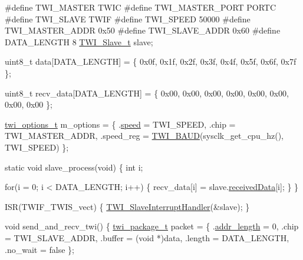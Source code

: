 \begin{DoxyCode}
\textcolor{preprocessor}{         #define TWI\_MASTER       TWIC}
\textcolor{preprocessor}{}\textcolor{preprocessor}{         #define TWI\_MASTER\_PORT  PORTC}
\textcolor{preprocessor}{}\textcolor{preprocessor}{         #define TWI\_SLAVE        TWIF}
\textcolor{preprocessor}{}\textcolor{preprocessor}{         #define TWI\_SPEED        50000}
\textcolor{preprocessor}{}\textcolor{preprocessor}{         #define TWI\_MASTER\_ADDR  0x50}
\textcolor{preprocessor}{}\textcolor{preprocessor}{         #define TWI\_SLAVE\_ADDR   0x60}
\textcolor{preprocessor}{}
\textcolor{preprocessor}{         #define DATA\_LENGTH     8}
\textcolor{preprocessor}{}
         \hyperlink{struct_t_w_i___slave}{TWI\_Slave\_t} slave;

         uint8\_t data[DATA\_LENGTH] = \{
             0x0f, 0x1f, 0x2f, 0x3f, 0x4f, 0x5f, 0x6f, 0x7f
         \};

         uint8\_t recv\_data[DATA\_LENGTH] = \{
             0x00, 0x00, 0x00, 0x00, 0x00, 0x00, 0x00, 0x00
         \};

         \hyperlink{structtwi__options__t}{twi\_options\_t} m\_options = \{
             .\hyperlink{structtwi__options__t_ad81e7400d394a2f72d7ad84588d3d661}{speed}     = TWI\_SPEED,
             .chip      = TWI\_MASTER\_ADDR,
             .speed\_reg = \hyperlink{group__group__xmega__drivers__twi__twim_gaf373fdbc2054cf1a070ba2a24ddaedf3}{TWI\_BAUD}(sysclk\_get\_cpu\_hz(), TWI\_SPEED)
         \};

         \textcolor{keyword}{static} \textcolor{keywordtype}{void} slave\_process(\textcolor{keywordtype}{void}) \{
             \textcolor{keywordtype}{int} i;

             \textcolor{keywordflow}{for}(i = 0; i < DATA\_LENGTH; i++) \{
                 recv\_data[i] = slave.\hyperlink{struct_t_w_i___slave_a8c205728fdea8bcaeaa0f6f889d83d4d}{receivedData}[i];
             \}
         \}

         ISR(TWIF\_TWIS\_vect) \{
             \hyperlink{group__group__xmega__drivers__twi__twis_ga0b140fb1b0b3f204e5c748c5f585fbb2}{TWI\_SlaveInterruptHandler}(&slave);
         \}

         \textcolor{keywordtype}{void} send\_and\_recv\_twi()
         \{
             \hyperlink{structtwi__package__t}{twi\_package\_t} packet = \{
                 .\hyperlink{structtwi__package__t_a397e982e6fa809c3fb834309537ffdbd}{addr\_length} = 0,
                 .chip        = TWI\_SLAVE\_ADDR,
                 .buffer      = (\textcolor{keywordtype}{void} *)data,
                 .length      = DATA\_LENGTH,
                 .no\_wait     = \textcolor{keyword}{false}
             \};


\end{DoxyCode}
